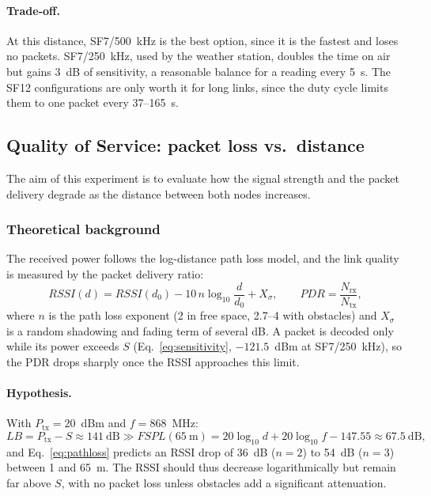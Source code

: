 \documentclass[informe,english]{plantilla}
\begin{document}
\paragraph{Trade-off.} At this distance, SF7/500~kHz is the best option, since it is the fastest and loses no packets. SF7/250~kHz, used by the weather station, doubles the time on air but gains 3~dB of sensitivity, a reasonable balance for a reading every 5~s. The SF12 configurations are only worth it for long links, since the duty cycle limits them to one packet every 37--165~s.


\subsection{Quality of Service: packet loss vs.\ distance}
\label{sec:exp-qos}

The aim of this experiment is to evaluate how the signal strength and the packet delivery degrade as the distance between both nodes increases.

\subsubsection{Theoretical background}

The received power follows the log-distance path loss model, and the link quality is measured by the packet delivery ratio:
\begin{equation}
    RSSI(d) = RSSI(d_0) - 10\,n\log_{10}\frac{d}{d_0} + X_\sigma, \qquad
    PDR = \frac{N_{\text{rx}}}{N_{\text{tx}}},
    \label{eq:pathloss}
\end{equation}
where $n$ is the path loss exponent (2 in free space, 2.7--4 with obstacles) and $X_\sigma$ is a random shadowing and fading term of several dB. A packet is decoded only while its power exceeds $S$ (Eq.~\eqref{eq:sensitivity}, $-121.5$~dBm at SF7/250~kHz), so the PDR drops sharply once the RSSI approaches this limit.

\paragraph{Hypothesis.} With $P_{\text{tx}} = 20$~dBm and $f = 868$~MHz:
\begin{equation}
    LB = P_{\text{tx}} - S \approx 141~\text{dB} \gg
    FSPL(65~\text{m}) = 20\log_{10}d + 20\log_{10}f - 147.55 \approx 67.5~\text{dB},
\end{equation}
and Eq.~\eqref{eq:pathloss} predicts an RSSI drop of 36~dB ($n = 2$) to 54~dB ($n = 3$) between 1 and 65~m. The RSSI should thus decrease logarithmically but remain far above $S$, with no packet loss unless obstacles add a significant attenuation.
\end{document}
